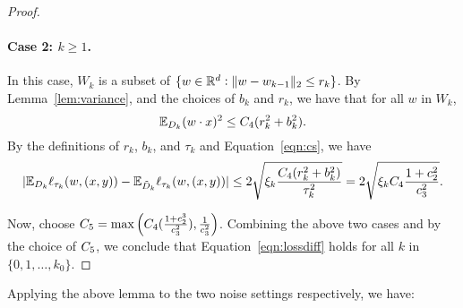 \begin{proof}
\paragraph{Case 2: $k \geq 1$.} In this case, $W_k$ is a subset of $\{w \in \mathbb{R}^d: \| w - w_{k-1} \|_2 \leq r_k \}$.
By Lemma~\ref{lem:variance}, and the choices of $b_k$ and $r_k$, we have that for all $w$ in $W_k$,
\begin{equation}
 \mathbb{E}_{D_k} (w \cdot x)^2 \leq C_4 (r_k^2 + b_k^2).
\label{eqn:variance}
\end{equation}
By the definitions of $r_k$, $b_k$, and $\tau_k$ and Equation~\eqref{eqn:cs}, we have
\[
|\mathbb{E}_{D_k} \ell_{\tau_k}(w, (x, y)) - \mathbb{E}_{\tilde{D}_k} \ell_{\tau_k}(w, (x, y)) |
\leq
2 \sqrt{\xi_k \frac{C_4(r_k^2 + b_k^2)}{\tau_k^2}} = 2 \sqrt{\xi_k C_4  \frac{1+c_2^2}{c_3^2}}.
\]

Now, choose $C_5 = \max\left(C_4(\frac{1+c_2^3}{c_3^2}), \frac{1}{c_3^2}\right)$. Combining the above two cases and by the choice of $C_5 $, we conclude that Equation~\eqref{eqn:lossdiff} holds for all $k$ in $\{0,1,\ldots,k_0\}$.
\end{proof}

Applying the above lemma to the two noise settings respectively, we have:

